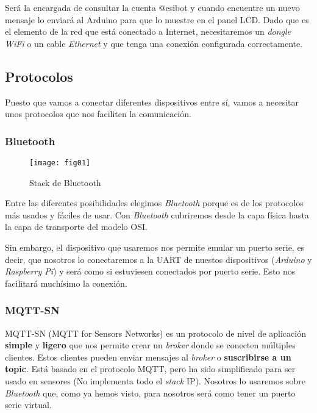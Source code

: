 Será la encargada de consultar la cuenta @esibot y cuando encuentre un nuevo
mensaje lo enviará al Arduino para que lo muestre en el panel LCD. Dado
que es el elemento de la red que está conectado a Internet, necesitaremos un
\emph{dongle} \emph{WiFi} o un cable \emph{Ethernet} y que tenga una conexión
configurada correctamente.

\subsection{Protocolos}\label{protocolos}

Puesto que vamos a conectar diferentes dispositivos entre sí, vamos a
necesitar unos protocolos que nos faciliten la comunicación.

\subsubsection{Bluetooth}\label{bluetooth}

\begin{figure}[h]
\texttt{[image: fig01]}
\centering
\caption{Stack de Bluetooth}
\end{figure}

Entre las diferentes posibilidades elegimos \emph{Bluetooth} porque es
de los protocolos más usados y fáciles de usar. Con \emph{Bluetooth}
cubriremos desde la capa física hasta la capa de transporte del modelo
OSI.

Sin embargo, el dispositivo que usaremos nos permite emular un puerto
serie, es decir, que nosotros lo conectaremos a la UART de nuestos
dispositivos (\emph{Arduino} y \emph{Raspberry Pi}) y será como si
estuviesen conectados por puerto serie. Esto nos facilitará muchísimo la
conexión.

\subsubsection{MQTT-SN}\label{mqtt-sn}

MQTT-SN (MQTT for Sensors Networks) es un protocolo de nivel de aplicación \textbf{simple}
y \textbf{ligero} que nos permite crear un \emph{broker} donde se
conecten múltiples clientes. Estos clientes pueden enviar mensajes al
\emph{broker} o \textbf{suscribirse a un topic}. Está basado en el
protocolo MQTT, pero ha sido simplificado para ser usado en sensores (No
implementa todo el \emph{stack} IP). Nosotros lo usaremos sobre
\emph{Bluetooth} que, como ya hemos visto, para nosotros será como tener
un puerto serie virtual.

